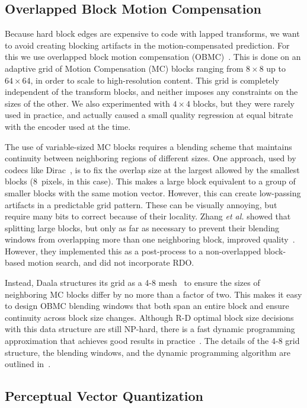 \documentclass[english,conference,10pt]{IEEEtran}
\begin{document}
\subsection{Overlapped Block Motion Compensation}

Because hard block edges are expensive to code with lapped transforms, we
want to avoid creating blocking artifacts in the motion-compensated
prediction. For this we use overlapped block motion compensation
(OBMC)~\cite{OBMC}. This is done on an adaptive grid of Motion Compensation
(MC) blocks ranging from $8\times 8$ up to $64\times 64$, in order to scale to
high-resolution content. This grid is completely independent of the transform
blocks, and neither imposes any constraints on the sizes of the other. We also
experimented with $4\times 4$ blocks, but they were rarely used in practice,
and actually caused a small quality regression at equal bitrate with the
encoder used at the time.

The use of variable-sized MC blocks requires a blending scheme that maintains
continuity between neighboring regions of different sizes. One approach, used
by codecs like Dirac~\cite{Dirac}, is to fix the overlap size at the largest
allowed by the smallest blocks (8~pixels, in this case). This makes a large
block equivalent to a group of smaller blocks with the same motion vector.
However, this can create low-passing artifacts in a predictable grid pattern.
These can be visually annoying, but require many bits to correct because of
their locality. Zhang \textit{et al.} showed that splitting large blocks,
but only as far as necessary to prevent their blending windows from
overlapping more than one neighboring block, improved quality~\cite{ZAS98}.
However, they implemented this as a post-process to a non-overlapped
block-based motion search, and did not incorporate RDO.

Instead, Daala structures its grid as a 4-8 mesh~\cite{DWSMAM97} to ensure the
sizes of neighboring MC blocks differ by no more than a factor of two. This
makes it easy to design OBMC blending windows that both span an entire block
and ensure continuity across block size changes. Although R-D optimal block
size decisions with this data structure are still NP-hard, there is a fast
dynamic programming approximation that achieves good results in
practice~\cite{Bal01}. The details of the 4-8 grid structure, the blending
windows, and the dynamic programming algorithm are outlined in~\cite{OBMC}.

\subsection{Perceptual Vector Quantization}
\end{document}
